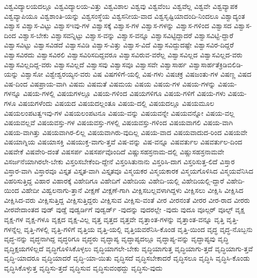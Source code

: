{ವಿಶ್ವವಿದ್ಯಾಲಯದಲ್ಲೂ
ವಿಶ್ವವಿದ್ಯಾಲಯ-ವಿತ್ತು
ವಿಶ್ವವಿಶಾಲ
ವಿಶ್ವವು
ವಿಶ್ವವೆಂಬ
ವಿಶ್ವವೆಲ್ಲ
ವಿಶ್ವವೇ
ವಿಶ್ವವ್ಯಾಪಕ
ವಿಶ್ವವ್ಯಾಪಿಯೂ
ವಿಶ್ವಶಾಂತಿ-ಯನ್ನು
ವಿಶ್ವಸಂಸ್ಥೆಯ
ವಿಶ್ವಸನೀಯ-ವಾದ
ವಿಶ್ವಸೃಷ್ಟಿಯಾದಂದಿ-ನಿಂದಲೂ
ವಿಶ್ವಾದ್ಯಂತ
ವಿಶ್ವಾಸ
ವಿಶ್ವಾಸ-ವಿಟ್ಟು
ವಿಶ್ವಾಸಇವು-ಗಳ
ವಿಶ್ವಾಸಕ್ಕೆ
ವಿಶ್ವಾಸ-ಗಳ
ವಿಶ್ವಾಸ-ಗಳನ್ನು
ವಿಶ್ವಾಸ-ಗಳಿಂದ
ವಿಶ್ವಾಸದ
ವಿಶ್ವಾಸ-ದಿಂದ
ವಿಶ್ವಾಸ-ಬೇಕು
ವಿಶ್ವಾಸವನ್ನಿಟ್ಟು
ವಿಶ್ವಾಸ-ವನ್ನು
ವಿಶ್ವಾಸ-ವನ್ನೂ
ವಿಶ್ವಾಸವಿಟ್ಟಿದ್ದಾದರೆ
ವಿಶ್ವಾಸವಿಟ್ಟಿ-ದ್ದಾರೆ
ವಿಶ್ವಾಸವಿಟ್ಟು
ವಿಶ್ವಾಸವಿಡದೆ
ವಿಶ್ವಾಸವಿಡಿ
ವಿಶ್ವಾಸ-ವಿತ್ತು
ವಿಶ್ವಾಸ-ವಿದೆ
ವಿಶ್ವಾಸವಿದ್ದುದಷ್ಟೇ
ವಿಶ್ವಾಸವಿರ-ದಿದ್ದರೆ
ವಿಶ್ವಾಸವಿರದು
ವಿಶ್ವಾಸವಿರಲಿ
ವಿಶ್ವಾಸವಿರಿಸದಿದ್ದವರೂ
ವಿಶ್ವಾಸವಿರುವ-ವರೆಲ್ಲ
ವಿಶ್ವಾಸವಿಲ್ಲದ
ವಿಶ್ವಾಸವಿಲ್ಲದ-ವರು
ವಿಶ್ವಾಸವಿಲ್ಲದಿದ್ದ-ವರು
ವಿಶ್ವಾಸವಿಲ್ಲದೆ
ವಿಶ್ವಾಸವು
ವಿಶ್ವಾಸವೂ
ವಿಶ್ವಾಸವೇ
ವಿಶ್ವಾಸಾರ್ಹ
ವಿಶ್ವಾಸಾರ್ಹತೆಕ್ರಿಡಿಬಿಲಿಡಿ-ಯನ್ನು
ವಿಶ್ವಾಸೋ
ವಿಶ್ವೇಶ್ವರಯ್ಯನ-ವರು
ವಿಷ
ವಿಷಗಳಿಗೆ-ಯಲ್ಲಿ
ವಿಷ-ಗಳು
ವಿಷಚಕ್ರ
ವಿಷಜಂತು-ಗಳ
ವಿಷಣ್ಣ
ವಿಷದ
ವಿಷ-ದಿಂದ
ವಿಷಪ್ರಾಯ-ವಾಗಿ
ವಿಷಮ
ವಿಷಮತೆ
ವಿಷಮಯ
ವಿಷಯ
ವಿಷಯ-ಗಳ
ವಿಷಯ-ಗಳನ್ನು
ವಿಷಯ-ಗಳನ್ನೂ
ವಿಷಯ-ಗಳಲ್ಲಿ
ವಿಷಯಗಳಲ್ಲೂ
ವಿಷಯ-ಗಳಿಂದ
ವಿಷಯಗಳಿಗೂ
ವಿಷಯ-ಗಳಿಗೆ
ವಿಷಯ-ಗಳು
ವಿಷಯ-ಗಳೂ
ವಿಷಯಗಳೆಂದು
ವಿಷಯದ
ವಿಷಯದಲ್ಲಂತೂ
ವಿಷಯ-ದಲ್ಲಿ
ವಿಷಯದಲ್ಲೂ
ವಿಷಯಮೂಲ
ವಿಷಯಲಂಪಟತ್ವಇವು-ಗಳ
ವಿಷಯಲಂಪಟನೂ
ವಿಷಯ-ವನ್ನು
ವಿಷಯವನ್ನೇ
ವಿಷಯವನ್ನೋ
ವಿಷಯ-ವಲ್ಲ
ವಿಷಯವಲ್ಲವೆ
ವಿಷಯವಸ್ತು-ಗಳ
ವಿಷಯವಸ್ತು-ಗಳಲ್ಲಿ
ವಿಷಯವಸ್ತು-ಗಳಿಂದ
ವಿಷಯವಾಗಲಿ
ವಿಷಯ-ವಾಗಿ
ವಿಷಯ-ವಾಗಿತ್ತು
ವಿಷಯವಾಗಿರ-ಲಿಲ್ಲ
ವಿಷಯವಾಗಿರು-ವುದಿಲ್ಲ
ವಿಷಯ-ವಾದ
ವಿಷಯವಾದುದ-ರಿಂದ
ವಿಷಯವೇ
ವಿಷಯಾಗ್ನಿಯ
ವಿಷಯಾಸಕ್ತಿ
ವಿಷಯುಕ್ತ-ವಾಗು-ತ್ತವೆ
ವಿಷ-ವನ್ನು
ವಿಷ-ವನ್ನೂ
ವಿಷವರ್ತುಲ
ವಿಷವರ್ತುಲ-ದಿಂದ
ವಿಷವೇಕೆ
ವಿಷವೇರಿ-ದಂತೆ
ವಿಷಸರ್ಪ
ವಿಷಸರ್ಪವೊಂದಿದೆ
ವಿಷ್ಣುಸಹಸ್ರನಾಮ-ದಲ್ಲಿ
ವಿಷ್ಣುಸಹಸ್ರನಾಮವೇ
ವಿಸರ್ಜನೆಯಾಗಿರಲೇ-ಬೇಕು
ವಿಸ್ತರಿಸಬೇಕೆಂದಿ-ದ್ದೇನೆ
ವಿಸ್ತರಿಸಿತುನಾನು
ವಿಸ್ತರಿಸಿ-ದಾಗ
ವಿಸ್ತರಿಸುತ್ತ-ಲಿದೆ
ವಿಸ್ತಾರ
ವಿಸ್ತಾರ-ವಾಗಿ
ವಿಸ್ತಾರವೂ
ವಿಸ್ತೃತ
ವಿಸ್ತೃತ-ವಾಗಿ
ವಿಸ್ತೃತವೂ
ವಿಸ್ಮಯಕರ
ವಿಸ್ಮಯಕಾರಕ
ವಿಸ್ಮಯಗೊಳಿಸಿದ
ವಿಸ್ಮಯವೆನಿಸಿದ
ವಿಹರಿಸುತ್ತಿದ್ದ
ವಿಹಾರ
ವಿಹಾರಕ್ಕೆ
ವಿಹೇದಿಗೂ
ವಿಹೇದಿಗೆ
ವಿಹೇದಿಯ
ವಿಹೇದಿ-ಯಲ್ಲಿ
ವಿಹೇದಿಯಲ್ಲಿ-ದ್ದಾರೆ
ವಿಹೇದಿ-ಯಿಂದ
ವಿಹೇದೀ
ವಿಹ್ವಲನಾಗು-ತ್ತಾನೆ
ವೀಕ್ಷಣೆ
ವೀಕ್ಷಣೆ-ಗಾಗಿ
ವೀಕ್ಷಿಸಬಲ್ಲವಳಾಗಿದ್ದಳು
ವೀಕ್ಷಿಸಲು
ವೀಕ್ಷಿಸಿ
ವೀಕ್ಷಿಸಿದ
ವೀಕ್ಷಿಸಿದ-ವರು
ವೀಕ್ಷಿಸುತ್ತಿದ್ದ
ವೀಕ್ಷಿಸುತ್ತಿದ್ದರು
ವೀಕ್ಷಿಸುವ
ವೀಕ್ಷಿಸು-ವಂತೆ
ವೀರ
ವೀರನಂತೆ
ವೀರರ
ವೀರ-ರಾದ
ವೀರರು
ವೀರವೇದಾಂತದ
ವುಡ್
ವುಡ್ಡೆ
ವುಡ್ವರ್ಡಿಗೆ
ವುಡ್ವರ್ಡ್
-ವುದನ್ನು
ವುದರಲ್ಲೇ
-ವುದು
ವುದೂ
ವೂಲ್ಗರ್
ವೂಲ್ಫ್
ವೃಕ್ಷ
ವೃಕ್ಷ-ಗಳ
ವೃಕ್ಷ-ಗಳೂ
ವೃಕ್ಷದ
ವೃಕ್ಷ-ವಿಲ್ಲ
ವೃತ್ತ
ವೃತ್ತದ
ವೃತ್ತವೇ
ವೃತ್ತಾಂತ-ಗಳನ್ನು
ವೃತ್ತಾಂತ-ವನ್ನೂ
ವೃತ್ತಿ
ವೃತ್ತಿ-ಗಳನ್ನೆಲ್ಲ
ವೃತ್ತಿ-ಗಳಲ್ಲಿ
ವೃತ್ತಿ-ಗಳಿಗೆ
ವೃತ್ತಿಯ
ವೃತ್ತಿ-ಯಲ್ಲಿ
ವೃತ್ತಿಯವರೆನಿಸಿ-ಕೊಂಡ
ವೃತ್ತಿ-ಯಿಂದ
ವೃದ್ಧ
ವೃದ್ಧ-ನೊಬ್ಬನು
ವೃದ್ಧ-ನನ್ನು
ವೃದ್ಧನಾಗಿದ್ದ
ವೃದ್ಧರಿಗೂ
ವೃದ್ಧರು
ವೃದ್ಧಾಪ್ಯ
ವೃದ್ಧಾಪ್ಯದಲ್ಲೂ
ವೃದ್ಧಾಪ್ಯ-ವನ್ನು
ವೃದ್ಧಾಪ್ಯವು
ವೃದ್ಧಿ
ವೃದ್ಧಿಕ್ಷಯಗಳಿಲ್ಲದೆ
ವೃದ್ಧಿಗೊಳಿಸಿಕೊಳ್ಳಲು
ವೃದ್ಧಿಯಾಗಲೇ-ಬೇಕು
ವೃದ್ಧಿಯಾಗುತ್ತ
ವೃದ್ಧಿಯಾಗು-ತ್ತದೆ
ವೃದ್ಧಿಯಾಗು-ತ್ತವೆ
ವೃದ್ಧಿ-ಯಾದರೂ
ವೃದ್ಧಿಯಾದರೆ
ವೃದ್ಧಿ-ಯಾ-ಯಿತು
ವೃದ್ಧಿಸದೆ
ವೃದ್ಧಿಸಬೇಕಾದರೆ
ವೃದ್ಧಿಸಲೂ
ವೃದ್ಧಿಸಿ
ವೃದ್ಧಿಸಿ-ಕೊಂಡು
ವೃದ್ಧಿಸಿಕೊಳ್ಳುತ್ತ
ವೃದ್ಧಿಸು-ತ್ತದೆ
ವೃದ್ಧಿಸುವ
ವೃದ್ಧಿಸುವಂಥದ್ದು
ವೃದ್ಧಿಸು-ವುದು
}
